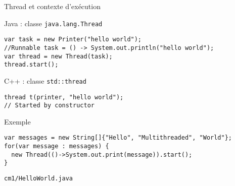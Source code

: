 
\begingroup

\begin{frame}[fragile]{Thread et contexte d'exécution}

  \begin{block}{Java : classe \lstinline{java.lang.Thread}}
     \begin{lstlisting}[numbers=none]
var task = new Printer("hello world");
//Runnable task = () -> System.out.println("hello world");
var thread = new Thread(task);
thread.start();
    \end{lstlisting}
    \end{block}

  \begin{block}{C++ : classe \lstinline{std::thread}}
    \begin{lstlisting}[numbers=none]
thread t(printer, "hello world");
// Started by constructor
   \end{lstlisting}
  \end{block}


  \begin{exampleblock}{Exemple}
    \begin{lstlisting}[numbers=none]
var messages = new String[]{"Hello", "Multithreaded", "World"};
for(var message : messages) {
  new Thread(()->System.out.print(message)).start();
}
   \end{lstlisting}
  \end{exampleblock}
\begin{citing}
\jitem \lstinline{cm1/HelloWorld.java}
\end{citing}
\end{frame}

\endgroup
\endinput

